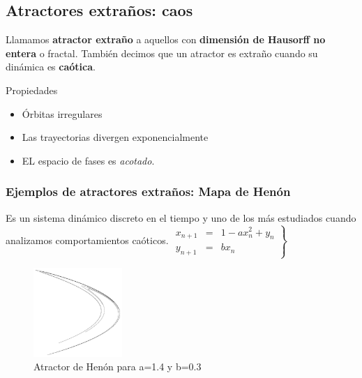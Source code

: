 \documentclass[8pt]{beamer}
\begin{document}
\subsection{Atractores extraños: caos}
\begin{frame}
\begin{definition}
Llamamos \textbf{atractor extraño} a aquellos con \textbf{dimensión de Hausorff no entera} o fractal. También decimos que un atractor es extraño cuando su dinámica es \textbf{caótica}.
\end{definition}
\begin{block}{Propiedades}
\begin{itemize}
\item Órbitas irregulares
\item Las trayectorias divergen exponencialmente
\item EL espacio de fases es \emph{acotado}.
\end{itemize}
\end{block}
\end{frame}
\subsubsection{Ejemplos de atractores extraños: Mapa de Henón}
\begin{frame}
\begin{definition}
Es un sistema dinámico discreto en el tiempo y uno de los más estudiados cuando analizamos comportamientos caóticos.\newline
$\left.
\begin{array}{rcl}
x_{n+1} & = & 1-ax^2_n+y_n\\
y_{n+1}& =& bx_n
\end{array}\right\}$\newline
\end{definition}
\begin{figure}[hbtp]
\centering
\includegraphics[width = 0.3\textwidth]{img/henon_clas.png}
\caption{Atractor de Henón para a=1.4 y b=0.3}
\label{fig:henon_clas}
\end{figure}
\end{frame}
\end{document}
